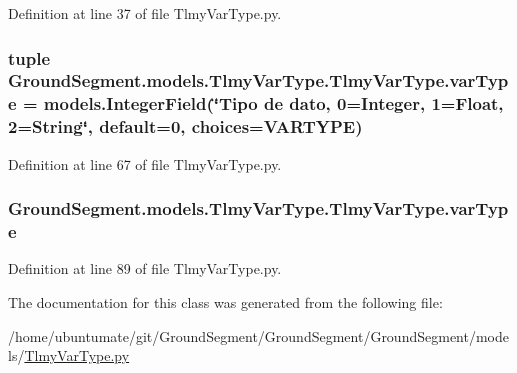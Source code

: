Definition at line 37 of file Tlmy\+Var\+Type.\+py.

\hypertarget{class_ground_segment_1_1models_1_1_tlmy_var_type_1_1_tlmy_var_type_a35be15cacdc2b07e3e0ef9a5962ef57a}{}
\subsubsection[{var\+Type}]{\setlength{\rightskip}{0pt plus 5cm}tuple Ground\+Segment.\+models.\+Tlmy\+Var\+Type.\+Tlmy\+Var\+Type.\+var\+Type = models.\+Integer\+Field(\char`\"{}Tipo de dato, 0=Integer, 1=Float, 2=String\char`\"{}, default=0, choices={\bf V\+A\+R\+T\+Y\+P\+E})\hspace{0.3cm}{\ttfamily [static]}}\label{class_ground_segment_1_1models_1_1_tlmy_var_type_1_1_tlmy_var_type_a35be15cacdc2b07e3e0ef9a5962ef57a}


Definition at line 67 of file Tlmy\+Var\+Type.\+py.

\hypertarget{class_ground_segment_1_1models_1_1_tlmy_var_type_1_1_tlmy_var_type_a3b48452b095327f2cefab2aec6b48c9b}{}
\subsubsection[{var\+Type}]{\setlength{\rightskip}{0pt plus 5cm}Ground\+Segment.\+models.\+Tlmy\+Var\+Type.\+Tlmy\+Var\+Type.\+var\+Type}\label{class_ground_segment_1_1models_1_1_tlmy_var_type_1_1_tlmy_var_type_a3b48452b095327f2cefab2aec6b48c9b}


Definition at line 89 of file Tlmy\+Var\+Type.\+py.



The documentation for this class was generated from the following file\+:\begin{DoxyCompactItemize}
\item 
/home/ubuntumate/git/\+Ground\+Segment/\+Ground\+Segment/\+Ground\+Segment/models/\hyperlink{_tlmy_var_type_8py}{Tlmy\+Var\+Type.\+py}\end{DoxyCompactItemize}
